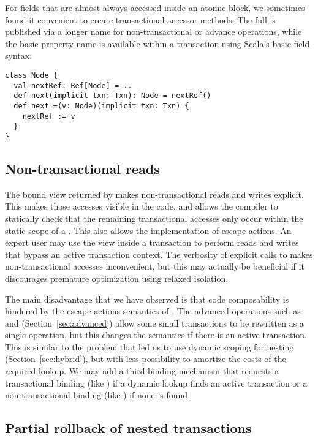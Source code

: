 For fields that are almost always accessed inside an atomic block, we
sometimes found it convenient to create transactional accessor methods.
The full  is published via a longer name for non-transactional
or advance operations, while the basic property name is available within
a transaction using Scala's basic field syntax:
\lstset{numbers=none}
\lstset{xleftmargin=0.125in}
\begin{lstlisting}
class Node {
  val nextRef: Ref[Node] = ..
  def next(implicit txn: Txn): Node = nextRef()
  def next_=(v: Node)(implicit txn: Txn) {
    nextRef := v 
  }
}
\end{lstlisting}
\lstset{xleftmargin=0.25in}
\lstset{numbers=left}

\subsection{Non-transactional reads}

The bound view returned by  makes
non-transactional reads and writes explicit.  This makes those accesses
visible in the code, and allows the compiler to statically check that
the remaining transactional accesses only occur within the static scope
of a .  This also allows the implementation of escape actions.
An expert user may use the  view inside a transaction to
perform reads and writes that bypass an active transaction context.
The verbosity of explicit calls to  makes non-transactional
accesses inconvenient, but this may actually be beneficial if it discourages
premature optimization using relaxed isolation.

The main disadvantage that we have observed is that code composability is
hindered by the escape actions semantics of .  The advanced
 operations such as  and 
(Section~\ref{sec:advanced}) allow some small transactions to be
rewritten as a single operation, but this changes the semantics if
there is an active transaction.  This is similar to the problem that
led us to use dynamic scoping for nesting (Section~\ref{sec:hybrid}),
but with less possibility to amortize the costs of the required
 lookup.  We may add a third binding mechanism that
requests a transactional binding (like ) if a
dynamic lookup finds an active transaction or a non-transactional binding
(like ) if none is found.

\subsection{Partial rollback of nested transactions}

